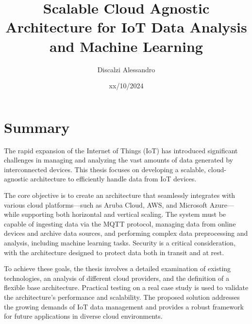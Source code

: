\documentclass[12pt,a4paper,twoside,openright]{extreport}
\title{Scalable Cloud Agnostic Architecture for IoT Data Analysis and Machine Learning}
\author{Discalzi Alessandro}
\date{xx/10/2024}
\begin{document}
    \pagestyle{empty} %

    
    \cleardoublepage
    
    
    \cleardoublepage

    \pagestyle{plain} %

    \chapter*{Summary}
    The rapid expansion of the Internet of Things (IoT) has introduced significant challenges in managing and analyzing the vast amounts of data generated by interconnected devices. This thesis focuses on developing a scalable, cloud-agnostic architecture to efficiently handle data from IoT devices.

The core objective is to create an architecture that seamlessly integrates with various cloud platforms—such as Aruba Cloud, AWS, and Microsoft Azure—while supporting both horizontal and vertical scaling. The system must be capable of ingesting data via the MQTT protocol, managing data from online devices and archive data sources, and performing complex data preprocessing and analysis, including machine learning tasks. Security is a critical consideration, with the architecture designed to protect data both in transit and at rest.

To achieve these goals, the thesis involves a detailed examination of existing technologies, an analysis of different cloud providers, and the definition of a flexible base architecture. Practical testing on a real case study is used to validate the architecture’s performance and scalability. The proposed solution addresses the growing demands of IoT data management and provides a robust framework for future applications in diverse cloud environments.

    \cleardoublepage

    \tableofcontents
    \cleardoublepage
    
    \listoffigures
    \listoftables
    \cleardoublepage
    

    
    \cleardoublepage
    
    \cleardoublepage
    
    \cleardoublepage
    
    \cleardoublepage
    
    \cleardoublepage
    
    \cleardoublepage
    
    \cleardoublepage
    
    \cleardoublepage

    \printbibliography[heading=bibintoc]
\end{document}
